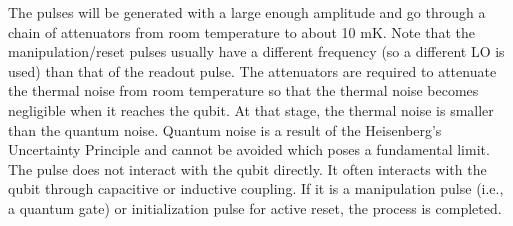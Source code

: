 \documentclass{article}
\begin{document}
The pulses will be generated with a large enough amplitude and go through a chain of attenuators from room temperature to about 10 mK. Note that the manipulation/reset pulses usually have a different frequency (so a different LO is used) than that of the readout pulse. The attenuators are required to attenuate the thermal noise from room temperature so that the thermal noise becomes negligible when it reaches the qubit. At that stage, the thermal noise is smaller than the quantum noise. Quantum noise is a result of the Heisenberg's Uncertainty Principle and cannot be avoided which poses a fundamental limit.
The pulse does not interact with the qubit directly. It often interacts with the qubit through capacitive or inductive coupling. If it is a manipulation pulse (i.e., a quantum gate) or initialization pulse for active reset, the process is completed.
\end{document}
